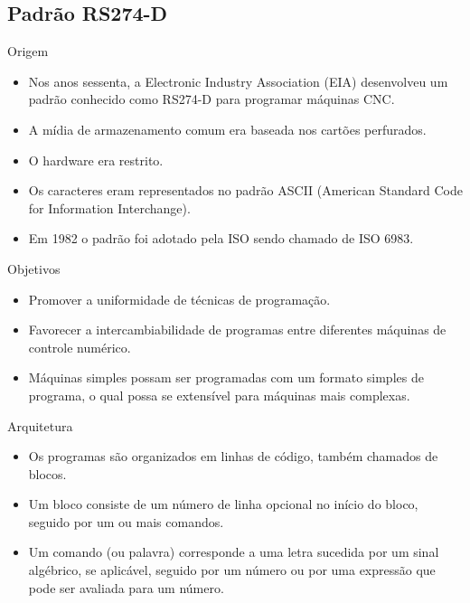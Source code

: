 \documentclass[aspectratio=169]{beamer}
\begin{document}
{\subsection{Padrão RS274-D}

\begin{frame}{Origem}
  \begin{itemize}
  \item {
    Nos anos sessenta, a Electronic Industry Association (EIA) desenvolveu um 
    padrão conhecido como RS274-D para programar máquinas CNC.
  }
  \item {
    A mídia de armazenamento comum era baseada nos cartões perfurados.
  }
  \item {
    O hardware era restrito.
  }
  \item {
    Os caracteres eram representados no padrão ASCII (American Standard Code for Information Interchange).
  }
  \item {
    Em 1982 o padrão foi adotado pela ISO sendo chamado de ISO 6983.
  }
  \end{itemize}
\end{frame}


\begin{frame}{Objetivos}
  \begin{itemize}
  \item {
    Promover a uniformidade de técnicas de programação.
  }
  \item {
    Favorecer a intercambiabilidade de programas entre diferentes máquinas de controle numérico.
  }
  \item {
    Máquinas simples possam ser programadas com um formato simples de programa,
    o qual possa se extensível para máquinas mais complexas.
  }
  \end{itemize}
\end{frame}


\begin{frame}{Arquitetura}
  \begin{itemize}
  \item {
    Os programas são organizados em linhas de código, também chamados de blocos.
  }
  \item {
    Um bloco consiste de um número de linha opcional no início do bloco, seguido por um 
    ou mais comandos.
  }
  \item {
    Um comando (ou palavra) corresponde a uma letra sucedida por um sinal algébrico, se aplicável, 
    seguido por um número ou por uma expressão que pode ser avaliada para um número.
  }
  \end{itemize}
\end{frame}


}
\end{document}
